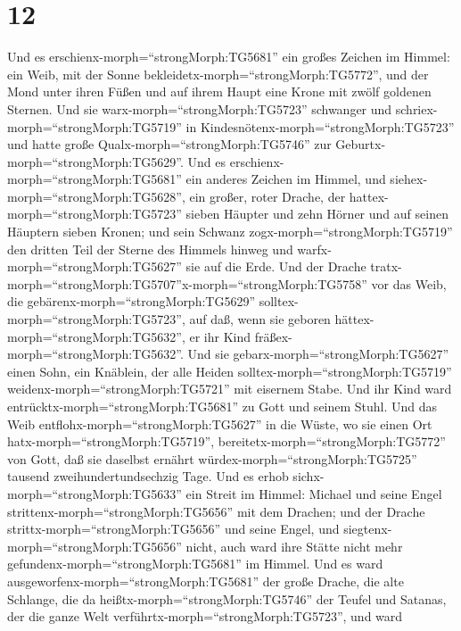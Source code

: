 \hypertarget{section-11}{%
\section{12}\label{section-11}}

 Und es erschienx-morph=``strongMorph:TG5681'' ein großes
Zeichen im Himmel: ein Weib, mit der Sonne
bekleidetx-morph=``strongMorph:TG5772'', und der Mond unter ihren Füßen
und auf ihrem Haupt eine Krone mit zwölf goldenen Sternen. 
Und sie warx-morph=``strongMorph:TG5723'' schwanger und
schriex-morph=``strongMorph:TG5719'' in
Kindesnötenx-morph=``strongMorph:TG5723'' und hatte große
Qualx-morph=``strongMorph:TG5746'' zur
Geburtx-morph=``strongMorph:TG5629''.  Und es
erschienx-morph=``strongMorph:TG5681'' ein anderes Zeichen im Himmel,
und siehex-morph=``strongMorph:TG5628'', ein großer, roter Drache, der
hattex-morph=``strongMorph:TG5723'' sieben Häupter und zehn Hörner und
auf seinen Häuptern sieben Kronen;  und sein Schwanz
zogx-morph=``strongMorph:TG5719'' den dritten Teil der Sterne des
Himmels hinweg und warfx-morph=``strongMorph:TG5627'' sie auf die Erde.
Und der Drache
tratx-morph=``strongMorph:TG5707''\textbar x-morph=``strongMorph:TG5758''
vor das Weib, die gebärenx-morph=``strongMorph:TG5629''
solltex-morph=``strongMorph:TG5723'', auf daß, wenn sie geboren
hättex-morph=``strongMorph:TG5632'', er ihr Kind
fräßex-morph=``strongMorph:TG5632''.  Und sie
gebarx-morph=``strongMorph:TG5627'' einen Sohn, ein Knäblein, der alle
Heiden solltex-morph=``strongMorph:TG5719''
weidenx-morph=``strongMorph:TG5721'' mit eisernem Stabe. Und ihr Kind
ward entrücktx-morph=``strongMorph:TG5681'' zu Gott und seinem Stuhl.
 Und das Weib entflohx-morph=``strongMorph:TG5627'' in die
Wüste, wo sie einen Ort hatx-morph=``strongMorph:TG5719'',
bereitetx-morph=``strongMorph:TG5772'' von Gott, daß sie daselbst
ernährt würdex-morph=``strongMorph:TG5725'' tausend
zweihundertundsechzig Tage.  Und es erhob
sichx-morph=``strongMorph:TG5633'' ein Streit im Himmel: Michael und
seine Engel strittenx-morph=``strongMorph:TG5656'' mit dem Drachen; und
der Drache strittx-morph=``strongMorph:TG5656'' und seine Engel,
 und siegtenx-morph=``strongMorph:TG5656'' nicht, auch ward
ihre Stätte nicht mehr gefundenx-morph=``strongMorph:TG5681'' im Himmel.
 Und es ward ausgeworfenx-morph=``strongMorph:TG5681'' der
große Drache, die alte Schlange, die da
heißtx-morph=``strongMorph:TG5746'' der Teufel und Satanas, der die
ganze Welt verführtx-morph=``strongMorph:TG5723'', und ward
